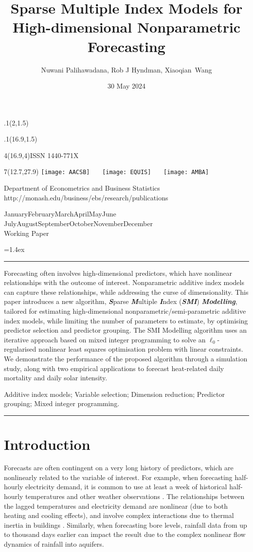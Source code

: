 \documentclass[
  11pt,
  a4paper,
]{article}
\title{Sparse Multiple Index Models for High-dimensional Nonparametric
Forecasting}
\date{30 May 2024}
\author{Nuwani Palihawadana, Rob J Hyndman, Xiaoqian~Wang}
\makeatletter
\def\placefig#1#2#3#4{\begin{textblock}{.1}(#1,#2)\rlap{\texttt{[image: \#4]}}\end{textblock}}
\def\Date{\number\day}
\def\Month{\ifcase\month\or
 January\or February\or March\or April\or May\or June\or
 July\or August\or September\or October\or November\or December\fi}
\def\Year{\number\year}
\def\showjel{{\large\textsf{\textbf{JEL classification:}}~\@jel}}
\def\cover{{\sffamily\setcounter{page}{0}
        \thispagestyle{empty}
        \placefig{2}{1.5}{width=5cm}{monash2}
        \placefig{16.9}{1.5}{width=2.1cm}{MBSportrait}
        \begin{textblock}{4}(16.9,4)ISSN 1440-771X\end{textblock}
        \begin{textblock}{7}(12.7,27.9)\hfill
        \texttt{[image: AACSB]}~~~
        \texttt{[image: EQUIS]}~~~
        \texttt{[image: AMBA]}
        \end{textblock}
        \vspace*{2.5cm}
        \begin{center}\Large
        Department of Econometrics and Business Statistics\\[.5cm]
        \footnotesize http://monash.edu/business/ebs/research/publications
        \end{center}\vspace{2cm}
        \begin{center}
        \fbox{\parbox{14cm}{\begin{onehalfspace}\centering\Huge\vspace*{0.3cm}
                \textsf{\textbf{\expandafter{\@title}}}\vspace{1cm}\par
                \LARGE
                \expandafter{\@author}
                \end{onehalfspace}
        }}
        \end{center}
        \vfill
                \begin{center}\Large
                \Month~\Year\\[1cm]
                Working Paper \@wp
        \end{center}\vspace*{2cm}}}
\def\pageone{{\sffamily\setstretch{1}%
        \thispagestyle{empty}%
        \vbox to \textheight{%
        \raggedright\baselineskip=1.2cm
     {\fontsize{24.88}{30}\sffamily\textbf{\expandafter{\@title}}}
        \vspace{2cm}\par
        \hspace{1cm}\parbox{14cm}{\sffamily\large\@addresses}\vspace{1cm}\vfill
        \hspace{1cm}{\large\Date~\Month~\Year}\\[1cm]
        \hspace{1cm}\showjel\vss}}}
\def\blindtitle{{\sffamily
     \thispagestyle{plain}\raggedright\baselineskip=1.2cm
     {\fontsize{24.88}{30}\sffamily\textbf{\expandafter{\@title}}}\vspace{1cm}\par
        }}
\def\titlepage{{\cover\newpage\pageone\newpage\blindtitle}}
\let\maketitle\titlepage
\newenvironment{keywords}{\par\vspace{0.5cm}\noindent{\sffamily\textbf{Keywords:}}}{\vspace{0.25cm}\par\hrule\vspace{0.5cm}\par}
\renewenvironment{abstract}{\begin{minipage}{\textwidth}\parskip=1.4ex\noindent
\hrule\vspace{0.1cm}\par{\sffamily\textbf{\abstractname}}\newline\setstretch{1.5}}
  {\end{minipage}}
\makeatother
\begin{document}
\maketitle

\begin{abstract}
Forecasting often involves high-dimensional predictors, which have
nonlinear relationships with the outcome of interest. Nonparametric
additive index models can capture these relationships, while addressing
the curse of dimensionality. This paper introduces a new algorithm,
\textbf{\emph{S}}parse \textbf{\emph{M}}ultiple \textbf{\emph{I}}ndex
(\textbf{\emph{SMI}}) \textbf{\emph{Modelling}}, tailored for estimating
high-dimensional nonparametric/semi-parametric additive index models,
while limiting the number of parameters to estimate, by optimising
predictor selection and predictor grouping. The SMI Modelling algorithm
uses an iterative approach based on mixed integer programming to solve
an \(\ell_{0}\)-regularised nonlinear least squares optimisation problem
with linear constraints. We demonstrate the performance of the proposed
algorithm through a simulation study, along with two empirical
applications to forecast heat-related daily mortality and daily solar
intensity.
\end{abstract}

\begin{keywords}
  Additive index models; Variable selection; Dimension
reduction; Predictor grouping; 
  Mixed integer programming.
\end{keywords}

\section{Introduction}\label{sec-introduction}

Forecasts are often contingent on a very long history of predictors,
which are nonlinearly related to the variable of interest. For example,
when forecasting half-hourly electricity demand, it is common to use at
least a week of historical half-hourly temperatures and other weather
observations \autocite{HF2010}. The relationships between the lagged
temperatures and electricity demand are nonlinear (due to both heating
and cooling effects), and involve complex interactions due to thermal
inertia in buildings \autocite{FH2012}. Similarly, when forecasting bore
levels, rainfall data from up to thousand days earlier can impact the
result \autocite{Peterson2014,Bakker2019,Rajaee2019} due to the complex
nonlinear flow dynamics of rainfall into aquifers.
\end{document}
